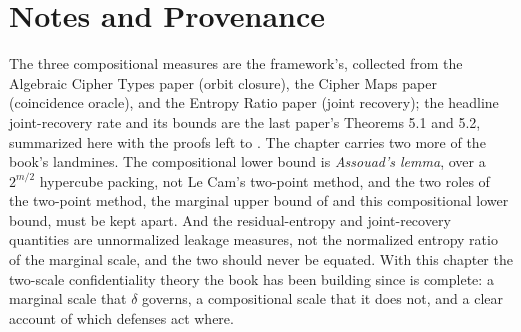 \section{Notes and Provenance}
\label{sec:ch10-notes}

The three compositional measures are the framework's, collected from the
Algebraic Cipher Types paper (orbit closure), the Cipher Maps paper
(coincidence oracle), and the Entropy Ratio paper (joint recovery); the
headline joint-recovery rate and its bounds are the last paper's Theorems 5.1
and 5.2, summarized here with the proofs left to \cite{towell2026maxconf}.
The chapter carries two more of the book's landmines. The compositional lower
bound is \emph{Assouad's lemma}, over a $2^{m/2}$ hypercube packing, not Le
Cam's two-point method, and the two roles of the two-point method, the
marginal upper bound of  and this compositional
lower bound, must be kept apart. And the residual-entropy and joint-recovery
quantities are unnormalized leakage measures, not the normalized entropy
ratio of the marginal scale, and the two should never be equated. With this
chapter the two-scale confidentiality theory the book has been building since
 is complete: a marginal scale that
$\delta$ governs, a compositional scale that it does not, and a clear account
of which defenses act where.
